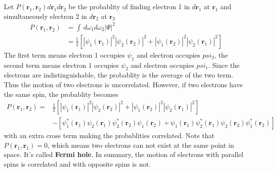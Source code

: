 \documentclass[11pt]{article}
\begin{document}
Let $P(\mathbf{r}_1,\mathbf{r}_2)d\mathbf{r}_1d\mathbf{r}_2$ be the probablity of finding electron 1 in
$d\mathbf{r}_1$ at $\mathbf{r}_1$ and simultaneously electron 2 in $d\mathbf{r}_2$ at $\mathbf{r}_2$
\begin{equation}
    \begin{split}
        P(\mathbf{r}_1,\mathbf{r}_2)&=\int\,d\omega_1d\omega_2|\Psi|^2\\
        &=\frac{1}{2}\left[|\psi_1(\mathbf{r}_1)|^2|\psi_2(\mathbf{r}_2)|^2+|\psi_1(\mathbf{r}_2)|^2|\psi_2(\mathbf{r}_1)|^2\right]
    \end{split}    
\end{equation}
The first term means electron 1 occupies $\psi_1$ and electron occupies $psi_2$, the second
term means electron 1 occupies $\psi_2$ and electron occupies $psi_1$. Since the electrons are
indistinguishable, the probablity is the average of the two term. Thus the motion of two electrons
is uncorrelated. However, if two electrons have the same spin, the probablity becomes
\begin{equation}
    \begin{split}
        P(\mathbf{r}_1,\mathbf{r}_2)=&\frac{1}{2}\left[|\psi_1(\mathbf{r}_1)|^2|\psi_2(\mathbf{r}_2)|^2+|\psi_1(\mathbf{r}_2)|^2|\psi_2(\mathbf{r}_1)|^2\right]\\
        &-\left[\psi_1^*(\mathbf{r}_1)\psi_2(\mathbf{r}_1)\psi_2^*(\mathbf{r}_2)\psi_1(\mathbf{r}_2)
        +\psi_1(\mathbf{r}_1)\psi_2^*(\mathbf{r}_1)\psi_2(\mathbf{r}_2)\psi_1^*(\mathbf{r}_2)\right]
    \end{split}
\end{equation}
with an extra cross term making the probablities correlated. Note that $P(\mathbf{r}_1,\mathbf{r}_1)=0$, which
means two electrons can not exist at the same point in space. It's called \textbf{Fermi hole}. In summary, the motion
of electrons with parallel spins is correlated and with opposite spins is not.
\end{document}
